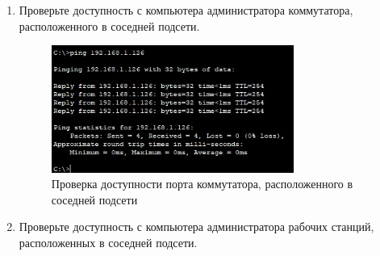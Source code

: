 \documentclass[bachelor, och, labwork]{shiza}
\begin{document}
\begin{enumerate}
        \item Проверьте доступность с компьютера администратора коммутатора, расположенного в соседней подсети.
        
        \begin{figure}[H]
            \centering      %
            \includegraphics[width=0.75\textwidth]{11}
            \caption{Проверка доступности порта коммутатора, расположенного в соседней подсети}
            \label{fig:image1}
        \end{figure}

        \item Проверьте доступность с компьютера администратора рабочих станций, расположенных в соседней подсети.
        

\end{enumerate}
\end{document}
